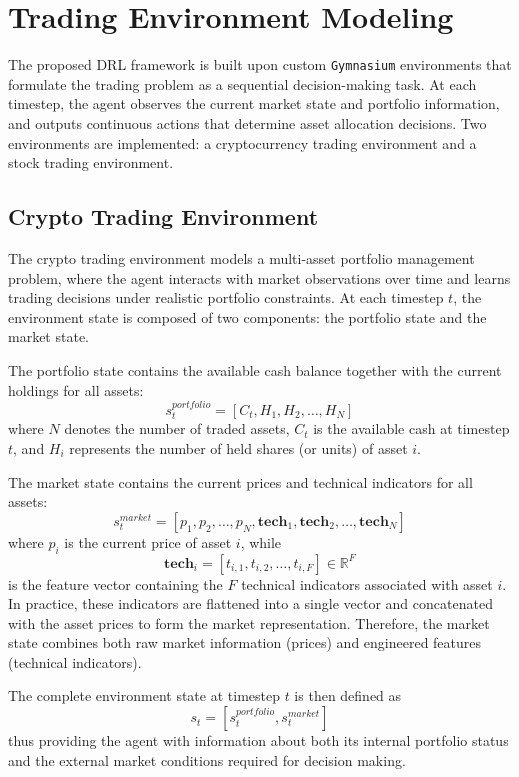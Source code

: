\section{Trading Environment Modeling}

The proposed DRL framework is built upon custom \texttt{Gymnasium} environments 
that formulate the trading problem as a sequential decision-making task. 
At each timestep, the agent observes the current market state and portfolio 
information, and outputs continuous actions that determine asset allocation 
decisions. Two environments are implemented: a cryptocurrency trading environment
and a stock trading environment.

\subsection{Crypto Trading Environment}

The crypto trading environment models a multi-asset portfolio management problem, 
where the agent interacts with market observations over time and learns trading decisions
under realistic portfolio constraints. At each timestep $t$, the environment state is 
composed of two components: the portfolio state and the market state.

The portfolio state contains the available cash balance together with the current holdings
for all assets:
\[
s_t^{portfolio}
=
[C_t, H_1, H_2, \dots, H_N]
\]
where $N$ denotes the number of traded assets, $C_t$ is the available cash at timestep 
$t$, and $H_i$ represents the number of held shares (or units) of asset $i$.

The market state contains the current prices and technical indicators for all assets:
\[
s_t^{market}
=
[p_1, p_2, \dots, p_N,
\mathbf{tech}_1,
\mathbf{tech}_2,
\dots,
\mathbf{tech}_N]
\]
where $p_i$ is the current price of asset $i$, while
\[
\mathbf{tech}_i
=
[t_{i,1}, t_{i,2}, \dots, t_{i,F}]
\in \mathbb{R}^{F}
\]
is the feature vector containing the $F$ technical indicators associated with 
asset $i$. In practice, these indicators are flattened into a single vector and
concatenated with the asset prices to form the market representation. Therefore,
the market state combines both raw market information (prices) and engineered 
features (technical indicators).

The complete environment state at timestep $t$ is then defined as
\[
s_t
=
[s_t^{portfolio}, s_t^{market}]
\]
thus providing the agent with information about both its internal portfolio status and 
the external market conditions required for decision making.

